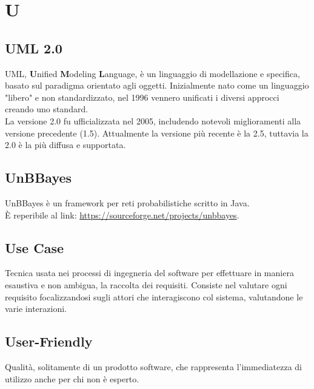 \section*{U}

\subsection{UML 2.0}
UML, \textbf{U}nified \textbf{M}odeling \textbf{L}anguage, è un linguaggio di modellazione e specifica, basato sul paradigma orientato agli oggetti. Inizialmente nato come un linguaggio "libero" e non standardizzato, nel 1996 vennero unificati i diversi approcci creando uno standard. \-\\
La versione 2.0 fu ufficializzata nel 2005, includendo notevoli miglioramenti alla versione precedente (1.5). Attualmente la versione più recente è la 2.5, tuttavia la 2.0 è la più diffusa e supportata.

\subsection{UnBBayes}
UnBBayes è un framework per reti probabilistiche scritto in Java. \\
È reperibile al link: \url{https://sourceforge.net/projects/unbbayes}.

\subsection{Use Case}
Tecnica usata nei processi di ingegneria del software per effettuare in maniera esaustiva e non ambigua, la raccolta dei requisiti. Consiste nel valutare ogni requisito focalizzandosi sugli attori che interagiscono col sistema, valutandone le varie interazioni.

\subsection{User-Friendly} 
Qualità, solitamente di un prodotto software, che rappresenta l'immediatezza di utilizzo anche per chi non è esperto.
